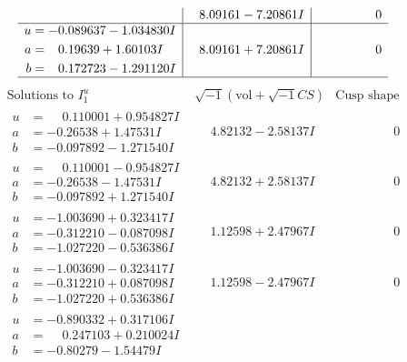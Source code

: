\documentclass[1p]{elsarticle_modified}
\theoremstyle{definition}
\newcommand{\I}{\sqrt{-1}}
\begin{document}
$$\begin{array}{c|c|c}
 & \phantom{-}8.09161 - 7.20861 I & \phantom{-0.000000 } 0 \\ \hline\begin{aligned}
u &= -0.089637 - 1.034830 I \\
a &= \phantom{-}0.19639 + 1.60103 I \\
b &= \phantom{-}0.172723 - 1.291120 I\end{aligned}
 & \phantom{-}8.09161 + 7.20861 I & \phantom{-0.000000 } 0\\
 \hline 
 \end{array}$$\newpage$$\begin{array}{c|c|c}  
\text{Solutions to }I^u_{1}& \I (\text{vol} + \sqrt{-1}CS) & \text{Cusp shape}\\
 \hline 
\begin{aligned}
u &= \phantom{-}0.110001 + 0.954827 I \\
a &= -0.26538 + 1.47531 I \\
b &= -0.097892 - 1.271540 I\end{aligned}
 & \phantom{-}4.82132 - 2.58137 I & \phantom{-0.000000 } 0 \\ \hline\begin{aligned}
u &= \phantom{-}0.110001 - 0.954827 I \\
a &= -0.26538 - 1.47531 I \\
b &= -0.097892 + 1.271540 I\end{aligned}
 & \phantom{-}4.82132 + 2.58137 I & \phantom{-0.000000 } 0 \\ \hline\begin{aligned}
u &= -1.003690 + 0.323417 I \\
a &= -0.312210 - 0.087098 I \\
b &= -1.027220 - 0.536386 I\end{aligned}
 & \phantom{-}1.12598 + 2.47967 I & \phantom{-0.000000 } 0 \\ \hline\begin{aligned}
u &= -1.003690 - 0.323417 I \\
a &= -0.312210 + 0.087098 I \\
b &= -1.027220 + 0.536386 I\end{aligned}
 & \phantom{-}1.12598 - 2.47967 I & \phantom{-0.000000 } 0 \\ \hline\begin{aligned}
u &= -0.890332 + 0.317106 I \\
a &= \phantom{-}0.247103 + 0.210024 I \\
b &= -0.80279 - 1.54479 I\end{aligned}

\end{array}$$
\end{document}
